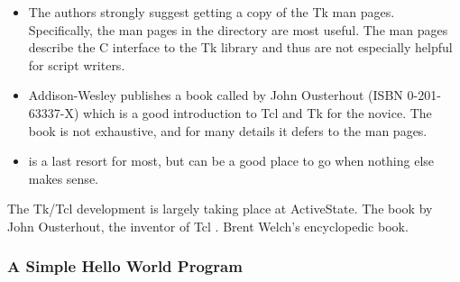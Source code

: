 \begin{itemize}
\item   The authors strongly suggest getting a copy of the Tk man
pages. Specifically, the man pages in the  directory are most
useful. The  man pages describe the C interface to the Tk
library and thus are not especially helpful for script writers.  

\item   Addison-Wesley publishes a book called  by John Ousterhout (ISBN 0-201-63337-X) which is a good
introduction to Tcl and Tk for the novice.  The book is not
exhaustive, and for many details it defers to the man pages. 

\item   {} is a last resort for most, but can be a good
place to go when nothing else makes sense.  
\end{itemize}

\begin{seealso}
        {The Tk/Tcl development is largely taking place at
         ActiveState.}
        {The book by John Ousterhout, the inventor of Tcl .}
        {Brent Welch's encyclopedic book.}
\end{seealso}


\subsubsection{A Simple Hello World Program} %



